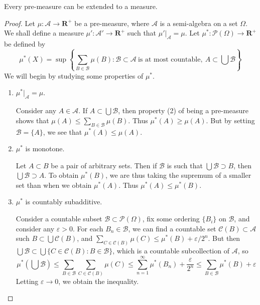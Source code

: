 \begin{theorem}
    Every pre-measure can be extended to a measure.
\end{theorem}
\begin{proof}
    Let $\mu:\mathcal{A} \to \mathbf{R}^+$ be a pre-measure, where $\mathcal{A}$ is a semi-algebra on a set $\Omega$. We shall define a measure $\mu':\mathcal{A}' \to \mathbf{R}^+$ such that $\mu'|_{\mathcal{A}} = \mu$. Let $\mu^*:\mathcal{P}(\Omega) \to \mathbf{R}^+$ be defined by
    \[ \mu^*(X) = \sup \left\{ \sum_{B \in \mathcal{B}} \mu(B) : \mathcal{B} \subset \mathcal{A}\ \text{is at most countable},\ A \subset \bigcup \mathcal{B} \right\} \]
    We will begin by studying some properties of $\mu^*$.
    \begin{enumerate}
        \item $\mu^*|_{\mathcal{A}} = \mu$.
        \begin{proof*}
            Consider any $A \in \mathcal{A}$. If $A \subset \bigcup \mathcal{B}$, then property (2) of being a pre-measure shows that $\mu(A) \leq \sum_{B \in \mathcal{B}} \mu(B)$. Thus $\mu^*(A) \geq \mu(A)$. But by setting $\mathcal{B} = \{ A \}$, we see that $\mu^*(A) \leq \mu(A)$.
        \end{proof*}

        \item $\mu^*$ is monotone.
        \begin{proof*}
            Let $A \subset B$ be a pair of arbitrary sets. Then if $\mathcal{B}$ is such that $\bigcup \mathcal{B} \supset B$, then $\bigcup \mathcal{B} \supset A$. To obtain $\mu^*(B)$, we are thus taking the supremum of a smaller set than when we obtain $\mu^*(A)$. Thus $\mu^*(A) \leq \mu^*(B)$.
        \end{proof*}

        \item $\mu^*$ is countably subadditive.
        \begin{proof*}
            Consider a countable subset $\mathcal{B} \subset \mathcal{P}(\Omega)$, fix some ordering $\{ B_i \}$ on $\mathcal{B}$, and consider any $\varepsilon > 0$. For each $B_n \in \mathcal{B}$, we can find a countable set $\mathcal{C}(B) \subset \mathcal{A}$ such $B \subset \bigcup \mathcal{C}(B)$, and $\sum_{C \in \mathcal{C}(B)}\mu(C) \leq \mu^*(B) + \varepsilon/2^n$. But then $\bigcup \mathcal{B} \subset \bigcup \{ C \in \mathcal{C}(B) : B \in \mathcal{B} \}$, which is a countable subcollection of $\mathcal{A}$, so
            \[ \mu^*(\bigcup \mathcal{B}) \leq \sum_{B \in \mathcal{B}} \sum_{C \in \mathcal{C}(B)} \mu(C) \leq \sum_{n = 1}^\infty \mu^*(B_n) + \frac{\varepsilon}{2^n} \leq \sum_{B \in \mathcal{B}} \mu^*(B) + \varepsilon \]
            Letting $\varepsilon \to 0$, we obtain the inequality.
        \end{proof*}
    \end{enumerate}


\end{proof}

